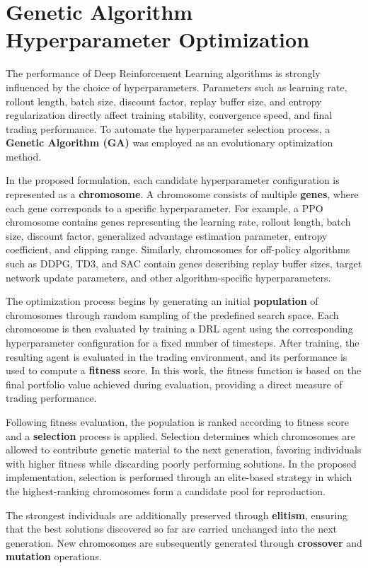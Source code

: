 \section{Genetic Algorithm Hyperparameter Optimization}

The performance of Deep Reinforcement Learning algorithms is strongly
influenced by the choice of hyperparameters. Parameters such as learning
rate, rollout length, batch size, discount factor, replay buffer size, and
entropy regularization directly affect training stability, convergence speed,
and final trading performance. To automate the hyperparameter selection
process, a \textbf{Genetic Algorithm (GA)} was employed as an evolutionary
optimization method.

In the proposed formulation, each candidate hyperparameter configuration is
represented as a \textbf{chromosome}. A chromosome consists of multiple
\textbf{genes}, where each gene corresponds to a specific hyperparameter.
For example, a PPO chromosome contains genes representing the learning rate,
rollout length, batch size, discount factor, generalized advantage estimation
parameter, entropy coefficient, and clipping range. Similarly, chromosomes for
off-policy algorithms such as DDPG, TD3, and SAC contain genes describing
replay buffer sizes, target network update parameters, and other
algorithm-specific hyperparameters.

The optimization process begins by generating an initial
\textbf{population} of chromosomes through random sampling of the predefined
search space. Each chromosome is then evaluated by training a DRL agent using
the corresponding hyperparameter configuration for a fixed number of
timesteps. After training, the resulting agent is evaluated in the trading
environment, and its performance is used to compute a \textbf{fitness}
score. In this work, the fitness function is based on the final portfolio
value achieved during evaluation, providing a direct measure of trading
performance.

Following fitness evaluation, the population is ranked according to fitness
score and a \textbf{selection} process is applied. Selection determines which
chromosomes are allowed to contribute genetic material to the next generation,
favoring individuals with higher fitness while discarding poorly performing
solutions. In the proposed implementation, selection is performed through an
elite-based strategy in which the highest-ranking chromosomes form a candidate
pool for reproduction.

The strongest individuals are additionally preserved through
\textbf{elitism}, ensuring that the best solutions discovered so far are
carried unchanged into the next generation. New chromosomes are subsequently
generated through \textbf{crossover} and \textbf{mutation} operations.

